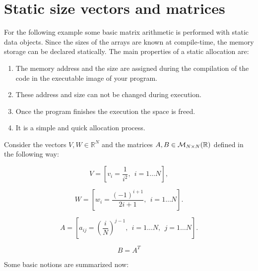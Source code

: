 \section{Static size vectors and matrices} 

For the following example some basic matrix arithmetic is performed with static data objects. 
Since the sizes of the arrays are known at compile-time, the memory storage can be declared statically. 
The main properties of a static allocation are:

\begin{enumerate}
    \item The memory address and the size are assigned during the compilation of the code in the executable image of your program.
    \item These address and size can not be changed during execution.
    \item Once the program finishes the execution the space is freed.
    \item It is a simple and quick allocation process.
\end{enumerate}


Consider the vectors $V, W \in \mathbb{R}^N$ and the matrices  $ A, B \in { \cal{M}}_{N \times N} (\mathbb{R})$ defined in the following way: 

$$
V = \left[ v_i =\frac{1}{i^2}, \ \ i = 1 \ldots  N \right],
$$

$$
W = \left[ w_i = \frac{(-1)^{i+1}}{2i+1}, \ \ i = 1 \ldots  N \right].
$$

$$
A = \left[ a_{ij} = \left( \frac{i}{N} \right)^{j-1}, \ \ i = 1 \ldots  N, \ \ j = 1 \ldots  N \right].
$$

$$
B = A^T
$$






Some basic notions are summarized now: 

